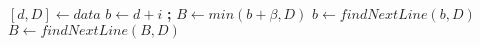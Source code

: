 \begin{algorithm}[hbtp]
\begin{algorithmic}[1]
\Statex

 \label{alg:el--get-block-begin}
  \State $[d, D] \gets data$
  \State $b \gets d+i$ \textbf{;} $B \gets min(b+\beta, D)$
    \State $b \gets findNextLine(b, D)$
  \EndIf
    \State $B \gets findNextLine(B, D)$
  \EndIf
  \Return{$[b, B]$}
\EndFunction \label{alg:el--get-block-end}
\end{algorithmic}
\end{algorithm}
